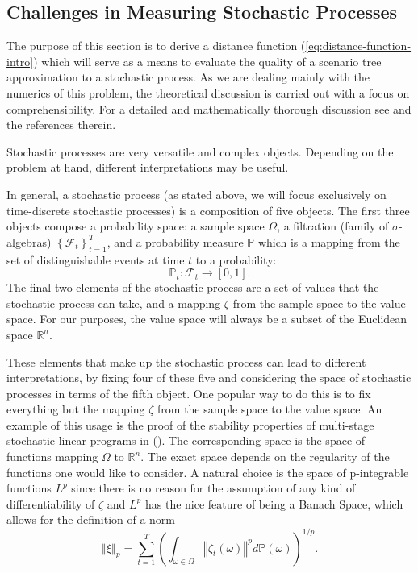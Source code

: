 \subsection{Challenges in Measuring Stochastic Processes}
\label{sec:measuring-challenges}
The purpose of this section is to derive a distance function (\ref{eq:distance-function-intro}) which will serve as a means to evaluate the quality of a scenario tree approximation to a stochastic process.
As we are dealing mainly with the numerics of this problem, the theoretical discussion is carried out with a focus on comprehensibility.
For a detailed and mathematically thorough discussion see \cite{Heitsch2010} and the references therein.

Stochastic processes are very versatile and complex objects.
Depending on the problem at hand, different interpretations may be useful. 

In general, a stochastic process (as stated above, we will focus exclusively on time-discrete stochastic processes) is a composition of five objects. The first three objects compose a probability space: a sample space $\Omega$, a filtration (family of $\sigma$-algebras) $\left\{\mathcal{F}_t\right\}_{t=1}^T$, and a probability measure $\mathbb{P}$ which is a mapping from the set of distinguishable events at time $t$ to a probability:
\begin{equation}
  \label{eq:prob-measure-definition}
  \mathbb{P}_t : \mathcal{F}_t \rightarrow \left[0,1\right]. 
\end{equation}
The final two elements of the stochastic process are a set of values that the stochastic process can take, and a mapping $\zeta$ from the sample space to the value space. For our purposes, the value space will always be a subset of the Euclidean space $\mathbb{R}^n$.

These elements that make up the stochastic process can lead to different interpretations, by fixing four of these five and considering the space of stochastic processes in terms of the fifth object. One popular way to do this is to fix everything but the mapping $\zeta$ from the sample space to the value space. An example of this usage is the proof of the stability properties of multi-stage stochastic linear programs in (\cite{Heitsch2010}). The corresponding space is the space of functions mapping $\Omega$ to $\mathbb{R}^n$. The exact space depends on the regularity of the functions one would like to consider. A natural choice is the space of p-integrable functions $L^p$ since there is no reason for the assumption of any kind of differentiability of $\zeta$ and $L^p$ has the nice feature of being a Banach Space, which allows for the definition of a norm
\begin{equation}
  \label{eq:Lp-norm}
  \left\Vert\xi\right\Vert_p = \sum_{t=1}^T\left(\int_{\omega\in \Omega}\left\Vert\zeta_t(\omega)\right\Vert^p d\mathbb{P}(\omega)\right)^{1/p}.
\end{equation}


